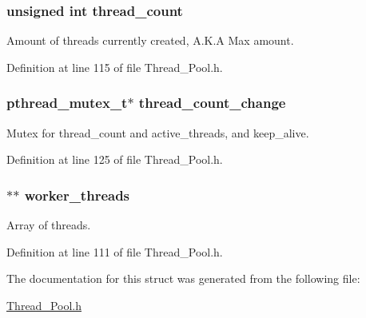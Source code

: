 \subsubsection[{thread\+\_\+count}]{\setlength{\rightskip}{0pt plus 5cm}unsigned int thread\+\_\+count}\label{struct_thread___pool_a2a469ce06ddf913155542574fd51e40e}


Amount of threads currently created, A.\+K.\+A Max amount. 



Definition at line 115 of file Thread\+\_\+\+Pool.\+h.

\hypertarget{struct_thread___pool_a701a0c5c72518f8f0f179142c671fe17}{}
\subsubsection[{thread\+\_\+count\+\_\+change}]{\setlength{\rightskip}{0pt plus 5cm}pthread\+\_\+mutex\+\_\+t$\ast$ thread\+\_\+count\+\_\+change}\label{struct_thread___pool_a701a0c5c72518f8f0f179142c671fe17}


Mutex for thread\+\_\+count and active\+\_\+threads, and keep\+\_\+alive. 



Definition at line 125 of file Thread\+\_\+\+Pool.\+h.

\hypertarget{struct_thread___pool_afc031365b3e1598d6e6c422c03722120}{}
\subsubsection[{worker\+\_\+threads}]{$\ast$$\ast$ worker\+\_\+threads}\label{struct_thread___pool_afc031365b3e1598d6e6c422c03722120}


Array of threads. 



Definition at line 111 of file Thread\+\_\+\+Pool.\+h.



The documentation for this struct was generated from the following file\+:\begin{DoxyCompactItemize}
\item 
\hyperlink{_thread___pool_8h}{Thread\+\_\+\+Pool.\+h}\end{DoxyCompactItemize}
